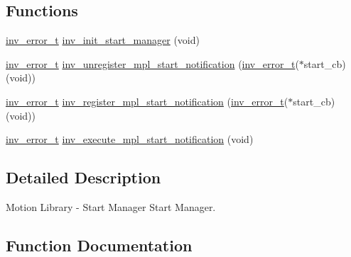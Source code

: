 \subsection*{Functions}
\begin{DoxyCompactItemize}
\item 
\hyperlink{structinv__error__t}{inv\+\_\+error\+\_\+t} \hyperlink{group___start___manager_ga10102d9afab8730a0363ae42f23189ae}{inv\+\_\+init\+\_\+start\+\_\+manager} (void)
\item 
\hyperlink{structinv__error__t}{inv\+\_\+error\+\_\+t} \hyperlink{group___start___manager_gabe5a1073f6729f8b9c9298d88155f4f6}{inv\+\_\+unregister\+\_\+mpl\+\_\+start\+\_\+notification} (\hyperlink{structinv__error__t}{inv\+\_\+error\+\_\+t}($\ast$start\+\_\+cb)(void))
\item 
\hyperlink{structinv__error__t}{inv\+\_\+error\+\_\+t} \hyperlink{group___start___manager_gabd4b991862c5333709f1093756dcea64}{inv\+\_\+register\+\_\+mpl\+\_\+start\+\_\+notification} (\hyperlink{structinv__error__t}{inv\+\_\+error\+\_\+t}($\ast$start\+\_\+cb)(void))
\item 
\hyperlink{structinv__error__t}{inv\+\_\+error\+\_\+t} \hyperlink{group___start___manager_ga9534cb6d029d54e3194fb44bbb46dc7e}{inv\+\_\+execute\+\_\+mpl\+\_\+start\+\_\+notification} (void)
\end{DoxyCompactItemize}


\subsection{Detailed Description}
Motion Library -\/ Start Manager Start Manager. 



\subsection{Function Documentation}
\hypertarget{group___start___manager_ga9534cb6d029d54e3194fb44bbb46dc7e}{}
